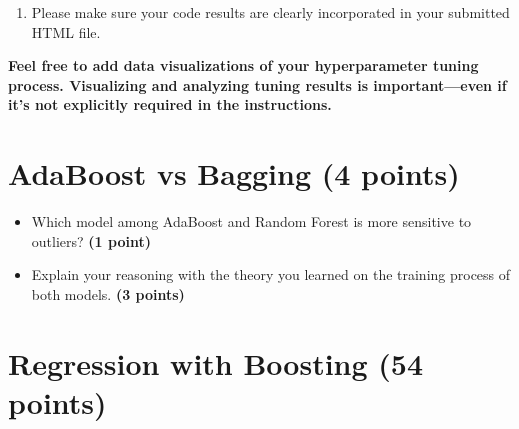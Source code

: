 \documentclass[
  letterpaper,
  DIV=11,
  numbers=noendperiod]{scrreprt}
\providecommand{\tightlist}{%
  \setlength{\itemsep}{0pt}\setlength{\parskip}{0pt}}\usepackage{longtable,booktabs,array}
\begin{document}
\begin{enumerate}
  \begin{itemize}
  \tightlist
  \item
    Must be an HTML file rendered using Quarto \textbf{(1 point)}.
    \emph{If you have a Quarto issue, you must mention the issue \&
    quote the error you get when rendering using Quarto in the comments
    section of Canvas, and submit the ipynb file.}
  \item
    No name can be written on the assignment, nor can there be any
    indicator of the student's identity---e.g.~printouts of the working
    directory should not be included in the final submission. \textbf{(1
    point)}
  \item
    There aren't excessively long outputs of extraneous information
    (e.g.~no printouts of entire data frames without good reason, there
    aren't long printouts of which iteration a loop is on, there aren't
    long sections of commented-out code, etc.) \textbf{(1 point)}
  \item
    Final answers to each question are written in the Markdown cells.
    \textbf{(1 point)}
  \item
    There is no piece of unnecessary / redundant code, and no
    unnecessary / redundant text. \textbf{(1 point)}
  \end{itemize}
\item
  Please make sure your code results are clearly incorporated in your
  submitted HTML file.
\end{enumerate}

\textbf{Feel free to add data visualizations of your hyperparameter
tuning process. Visualizing and analyzing tuning results is
important---even if it's not explicitly required in the instructions.}

\section{AdaBoost vs Bagging (4
points)}\label{adaboost-vs-bagging-4-points}

\begin{itemize}
\tightlist
\item
  Which model among AdaBoost and Random Forest is more sensitive to
  outliers? \textbf{(1 point)}
\item
  Explain your reasoning with the theory you learned on the training
  process of both models. \textbf{(3 points)}
\end{itemize}

\section{Regression with Boosting (54
points)}\label{regression-with-boosting-54-points}
\end{document}
